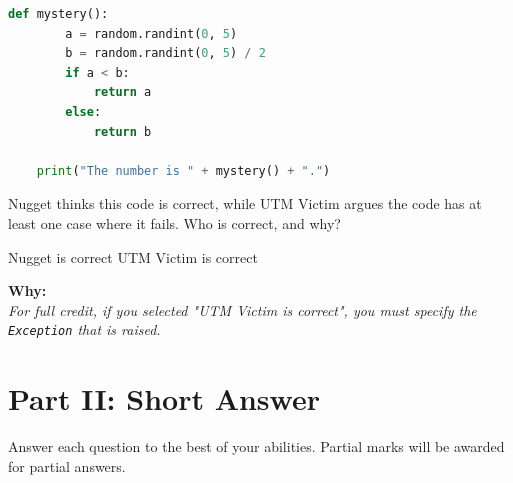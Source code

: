 \documentclass[letterpaper,12pt,addpoints]{exam}
\begin{document}
\begin{questions}
\begin{lstlisting}[language=Python, style=mystyle]
    def mystery():
        a = random.randint(0, 5)
        b = random.randint(0, 5) / 2
        if a < b:
            return a
        else:
            return b

    print("The number is " + mystery() + ".")
    \end{lstlisting}
    Nugget thinks this code is correct, while UTM Victim argues the code has at least one case where it fails. Who is correct, and why?
    \begin{choices}
        \choice Nugget is correct
        \choice UTM Victim is correct
    \end{choices}
    \textbf{Why:} \underline{\hspace{15cm}} \\
    \textit{For full credit, if you selected "UTM Victim is correct", you must specify the \texttt{Exception} that is raised.} \underline{\hspace{15cm}}

    \setcounter{question}{0}
    \clearpage
    \section*{Part II: Short Answer}
    Answer each question to the best of your abilities. Partial marks will be awarded for partial answers. 


\end{questions}
\end{document}
